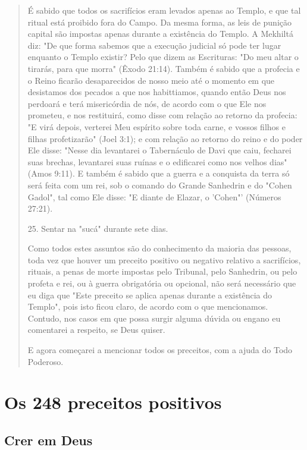\begin{quote}
É sabido que todos os sacrifícios eram levados apenas ao Templo, e que
tal ritual está proibido fora do Campo. Da mesma forma, as leis de
puni­ção capital são impostas apenas durante a existência do Templo. A
Mekhiltá diz: "De que forma sabemos que a execução judicial só pode ter
lugar enquanto o Templo existir? Pelo que dizem as Escrituras: "Do meu
altar o tirarás, para que morra" (Êxodo 21:14). Também é sabido que a
profecia e o Reino ficarão desaparecidos de nosso meio até o momento em
que desistamos dos pecados a que nos habittiamos, quando então Deus nos
perdoará e terá misericórdia de nós, de acordo com o que Ele nos
prometeu, e nos restituirá, como disse com relação ao retorno da
profecia: "E virá depois, verterei Meu espírito sobre toda carne, e
vossos filhos e filhas profetizarão" (Joel 3:1); e com relação ao
retorno do reino e do poder Ele disse: "Nesse dia levantarei o
Tabernáculo de Davi que caiu, fecharei suas brechas, levantarei suas
ruínas e o edificarei como nos ve­lhos dias" (Amos 9:11). E também é
sabido que a guerra e a conquista da terra só será feita com um rei, sob
o comando do Grande Sanhedrin e do "Cohen Gadol", tal como Ele disse: "E
diante de Elazar, o 'Cohen"' (Números 27:21).

25. Sentar na "sucá" durante sete dias.

Como todos estes assuntos são do conhecimento da maioria das pes­soas,
toda vez que houver um preceito positivo ou negativo relativo a
sacrifí­cios, rituais, a penas de morte impostas pelo Tribunal, pelo
Sanhedrin, ou pelo profeta e rei, ou à guerra obrigatória ou opcional,
não será necessário que eu diga que "Este preceito se aplica apenas
durante a existência do Templo", pois isto ficou claro, de acordo com o
que mencionamos. Contudo, nos casos em que possa surgir alguma dúvida ou
engano eu comentarei a respeito, se Deus quiser.

E agora começarei a mencionar todos os preceitos, com a ajuda do Todo
Poderoso.
\end{quote}



\chapter{Os 248 preceitos positivos}

\section{Crer em Deus} %

